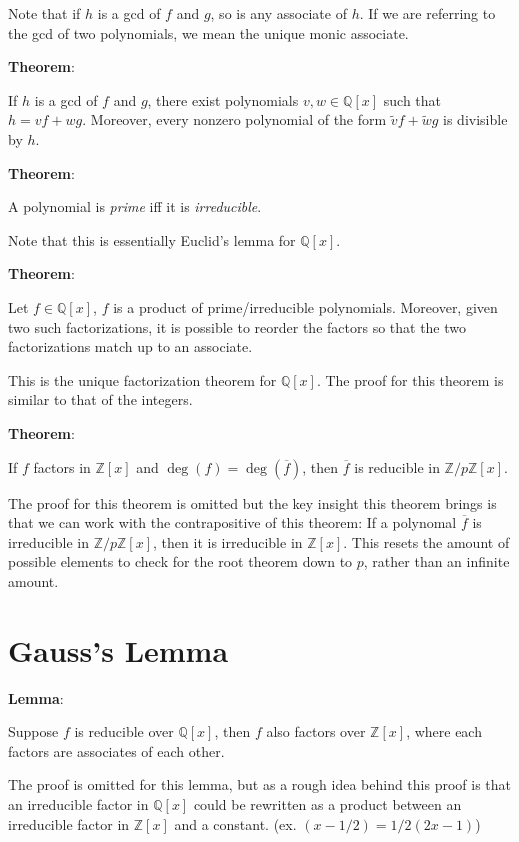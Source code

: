 \documentclass{article}
\begin{document}
\begin{multicols*}{2}
Note that if $h$ is a gcd of $f$ and $g$, so is any associate of $h$. If we are referring to the gcd of two polynomials, we mean the unique monic associate.

\textbf{Theorem}:

If $h$ is a gcd of $f$ and $g$, there exist polynomials $v, w \in \mathbb{Q}[x]$ such that $h = vf + wg$. Moreover, every nonzero polynomial of the form $\tilde{v}f+\tilde{w}g$ is divisible by $h$.

\textbf{Theorem}:

A polynomial is \textit{prime} iff it is \textit{irreducible}.

Note that this is essentially Euclid's lemma for $\mathbb{Q}[x]$.

\textbf{Theorem}:

Let $f \in \mathbb{Q}[x]$, $f$ is a product of prime/irreducible polynomials. Moreover, given two such factorizations, it is possible to reorder the factors so that the two factorizations match up to an associate.

This is the unique factorization theorem for $\mathbb{Q}[x]$. The proof for this theorem is similar to that of the integers.

\textbf{Theorem}:

If $f$ factors in $\mathbb{Z}[x]$ and $\deg(f) = \deg(\overline{f})$, then $\overline{f}$ is reducible in $\mathbb{Z}/p\mathbb{Z}[x]$.

The proof for this theorem is omitted but the key insight this theorem brings is that we can work with the contrapositive of this theorem: If a polynomal $\overline{f}$ is irreducible in $\mathbb{Z}/p\mathbb{Z}[x]$, then it is irreducible in $\mathbb{Z}[x]$. This resets the amount of possible elements to check for the root theorem down to $p$, rather than an infinite amount.

\section{Gauss's Lemma}

\textbf{Lemma}:

Suppose $f$ is reducible over $\mathbb{Q}[x]$, then $f$ also factors over $\mathbb{Z}[x]$, where each factors are associates of each other.

The proof is omitted for this lemma, but as a rough idea behind this proof is that an irreducible factor in $\mathbb{Q}[x]$ could be rewritten as a product between an irreducible factor in $\mathbb{Z}[x]$ and a constant. (ex. $(x-1/2) = 1/2(2x-1)$)


\end{multicols*}
\end{document}
